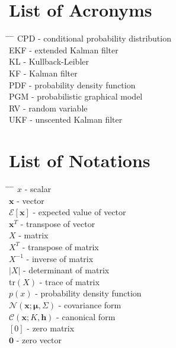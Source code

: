 \documentclass[12pt,oneside,openany,a4paper, %
afrikaans,english,
]{memoir}
\numberwithin{equation}{chapter}
\begin{document}
{\pagebreak


\tableofcontents
{}
\pagebreak
\listoffigures
\listoftables
\chapter{List of Acronyms}

\begin{tabbing}
\hspace*{1em}\= \hspace*{5em} \= \hspace*{3em} \= \kill %
\> CPD	\> - \> conditional probability distribution\\
\> EKF	\> - \> extended Kalman filter\\
\> KL	\> - \> Kullback-Leibler\\
\> KF	\> - \> Kalman filter\\
\> PDF	\> - \> probability density function\\
\> PGM	\> - \> probabilistic graphical model\\
\> RV \> - \>	random variable\\
\> UKF	\> - \> unscented Kalman filter\\
\end{tabbing}

\chapter{List of Notations}
\begin{tabbing}
\hspace*{1em}\= \hspace*{5em} \= \hspace*{3em} \= \kill %
\> $x$	\> - \> scalar\\
\> $\bm{x}$	\> - \> vector\\
\> $\mathcal{E}[\bm{x}]$	\> - \>  expected value of vector\\
\> $\bm{x}^T$	\> - \> transpose of vector\\
\> $X$ \> - \> matrix\\
\> $X^T$ \> - \> transpose of matrix\\
\> $X^{-1}$ \> - \> inverse of matrix\\
\> $|X|$ \> - \> determinant of matrix\\
\> tr$(X)$ \> - \> trace of matrix\\
\> $p(x)$ \> - \> probability density function\\
\> $\mathcal{N}(\bm{x}; \bm{\mu}, \Sigma)$ \> - \> covariance form\\
\> $\mathcal{C}(\bm{x}; K, \bm{h})$ \> - \> canonical form\\
\> $[0]$ \> - \> zero matrix\\
\> $\bm{0}$ \> - \> zero vector
\end{tabbing}

}
\end{document}
